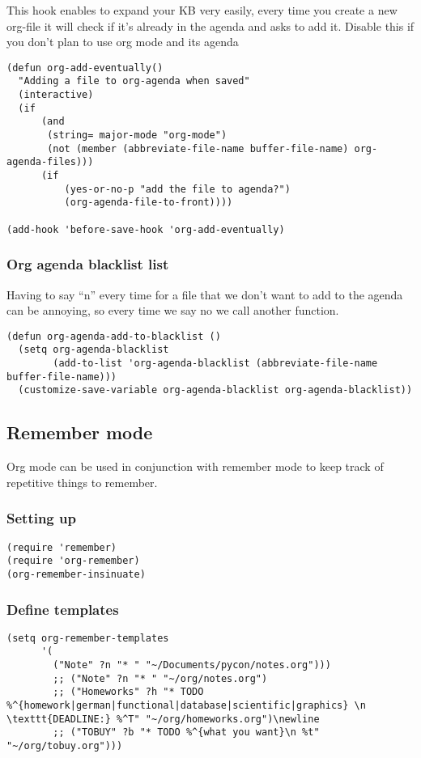 \documentclass[11pt]{article}
\begin{document}
   This hook enables to expand your KB very easily, every time you create a new org-file it will check if it's already in the agenda and asks to add it.
   Disable this if you don't plan to use org mode and its agenda
\begin{verbatim}
(defun org-add-eventually()
  "Adding a file to org-agenda when saved"
  (interactive)
  (if 
      (and
       (string= major-mode "org-mode")
       (not (member (abbreviate-file-name buffer-file-name) org-agenda-files)))
      (if
          (yes-or-no-p "add the file to agenda?")
          (org-agenda-file-to-front))))

(add-hook 'before-save-hook 'org-add-eventually)
\end{verbatim}
\subsubsection{Org agenda blacklist list}
\label{sec-24.6.1}

    Having to say ``n'' every time for a file that we don't want to add to the agenda can be annoying, so every time we say no we call another function.

\begin{verbatim}
(defun org-agenda-add-to-blacklist ()
  (setq org-agenda-blacklist
        (add-to-list 'org-agenda-blacklist (abbreviate-file-name buffer-file-name)))
  (customize-save-variable org-agenda-blacklist org-agenda-blacklist))
\end{verbatim}
\subsection{Remember mode}
\label{sec-24.7}

   Org mode can be used in conjunction with remember mode to keep track of repetitive things to remember.
\subsubsection{Setting up}
\label{sec-24.7.1}

\begin{verbatim}
(require 'remember)
(require 'org-remember)
(org-remember-insinuate)
\end{verbatim}
\subsubsection{Define templates}
\label{sec-24.7.2}

\begin{verbatim}
(setq org-remember-templates
      '(
        ("Note" ?n "* " "~/Documents/pycon/notes.org")))
        ;; ("Note" ?n "* " "~/org/notes.org")
        ;; ("Homeworks" ?h "* TODO %^{homework|german|functional|database|scientific|graphics} \n \texttt{DEADLINE:} %^T" "~/org/homeworks.org")\newline
        ;; ("TOBUY" ?b "* TODO %^{what you want}\n %t" "~/org/tobuy.org")))
\end{verbatim}
\end{document}
